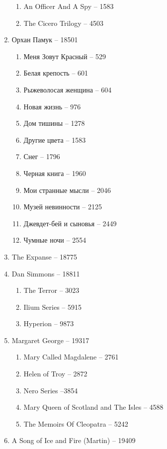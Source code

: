 \documentclass[a4paper, 11pt]{proc} %
\begin{document}
\begin{enumerate}
\begin{enumerate}
            \item An Officer And A Spy -- 1583
            \item The Cicero Trilogy -- 4503
        \end{enumerate}
    \item Орхан Памук -- 18501
        \begin{enumerate}
            \item Меня Зовут Красный -- 529
            \item Белая крепость -- 601
            \item Рыжеволосая женщина -- 604
            \item Новая жизнь -- 976
            \item Дом тишины -- 1278
            \item Другие цвета -- 1583
            \item Снег -- 1796
            \item Черная книга -- 1960
            \item Мои странные мысли -- 2046
            \item Музей невинности -- 2125
            \item Джевдет-бей и сыновья -- 2449
            \item Чумные ночи -- 2554
        \end{enumerate}
    \item The Expanse -- 18775
    \item Dan Simmons -- 18811
        \begin{enumerate}
            \item The Terror -- 3023
            \item Ilium Series -- 5915
            \item Hyperion -- 9873
        \end{enumerate}
    \item Margaret George -- 19317
        \begin{enumerate}
            \item Mary Called Magdalene -- 2761
            \item Helen of Troy -- 2872
            \item Nero Series --3854
            \item Mary Queen of Scotland and The Isles -- 4588
            \item The Memoirs Of Cleopatra -- 5242
        \end{enumerate}
    \item A Song of Ice and Fire (Martin) -- 19409

\end{enumerate}
\end{document}

